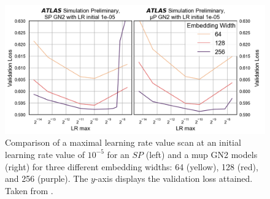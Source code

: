 \begin{figure}[h!]
  \centering
  \includegraphics[width=\textwidth]{Images/FTAG/GN/HPO/maincompmupsp.png}
  \caption{Comparison of a maximal learning rate value scan at an initial learning rate value of $10^{-5}$ for an $SP$ (left) and a \gls{mup} GN2 models (right) for three different embedding widths: 64 (yellow), 128 (red), and 256 (purple). The $y$-axis displays the validation loss attained. Taken from \cite{publicplotMUP}.}
  \label{fig:maincompmupsp}
\end{figure} 

